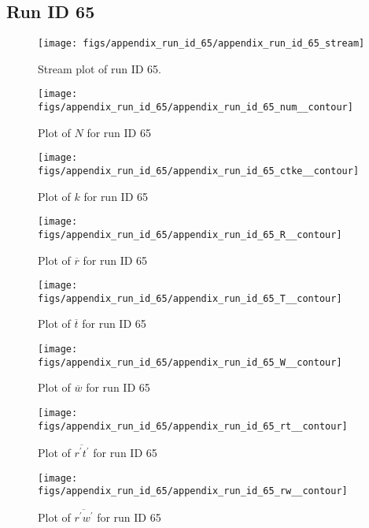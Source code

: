 \subsection{Run ID 65}
\begin{figure}[H]
\centering
\texttt{[image: figs/appendix\_run\_id\_65/appendix\_run\_id\_65\_stream]}
\caption{Stream plot of run ID 65.}
\label{fig:appendix_run_id_65_stream}
\end{figure}


\begin{figure}[H]
\centering
\texttt{[image: figs/appendix\_run\_id\_65/appendix\_run\_id\_65\_num\_\_contour]}
\caption{Plot of $N$ for run ID 65}
\label{fig:appendix_run_id_65_num__contour}
\end{figure}


\begin{figure}[H]
\centering
\texttt{[image: figs/appendix\_run\_id\_65/appendix\_run\_id\_65\_ctke\_\_contour]}
\caption{Plot of $k$ for run ID 65}
\label{fig:appendix_run_id_65_ctke__contour}
\end{figure}


\begin{figure}[H]
\centering
\texttt{[image: figs/appendix\_run\_id\_65/appendix\_run\_id\_65\_R\_\_contour]}
\caption{Plot of $\overline{r}$ for run ID 65}
\label{fig:appendix_run_id_65_R__contour}
\end{figure}


\begin{figure}[H]
\centering
\texttt{[image: figs/appendix\_run\_id\_65/appendix\_run\_id\_65\_T\_\_contour]}
\caption{Plot of $\overline{t}$ for run ID 65}
\label{fig:appendix_run_id_65_T__contour}
\end{figure}


\begin{figure}[H]
\centering
\texttt{[image: figs/appendix\_run\_id\_65/appendix\_run\_id\_65\_W\_\_contour]}
\caption{Plot of $\overline{w}$ for run ID 65}
\label{fig:appendix_run_id_65_W__contour}
\end{figure}


\begin{figure}[H]
\centering
\texttt{[image: figs/appendix\_run\_id\_65/appendix\_run\_id\_65\_rt\_\_contour]}
\caption{Plot of $\overline{r^\prime t^\prime}$ for run ID 65}
\label{fig:appendix_run_id_65_rt__contour}
\end{figure}


\begin{figure}[H]
\centering
\texttt{[image: figs/appendix\_run\_id\_65/appendix\_run\_id\_65\_rw\_\_contour]}
\caption{Plot of $\overline{r^\prime w^\prime}$ for run ID 65}
\label{fig:appendix_run_id_65_rw__contour}
\end{figure}


